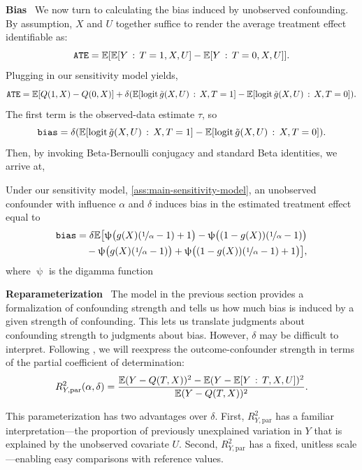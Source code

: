 \documentclass{article}
\DeclareRobustCommand{\parhead}[1]{\textbf{#1}~}
\newcommand{\digammafn}{\uppsi}
\begin{document}
%
%
%
%
%
%
%
%
%

%
%
%
%
%
%
%
%
%
%
%
%

\parhead{Bias}
We now turn to calculating the bias induced by unobserved confounding.
By assumption, $X$ and $U$ together
suffice to render the average treatment effect identifiable as:
\[
\mathtt{ATE}=\EE[\EE[Y\given T=1,X,U]-\EE[Y\given T=0,X,U]].
\] 
Plugging in our sensitivity model yields,
\[
  \mathtt{ATE} =\EE[Q(1,X)-Q(0,X)] +\delta(\EE[\logit\tilde{g}(X,U)\given X,T=1]-\EE[\logit\tilde{g}(X,U)\given X,T=0]).
\]
The first term is the observed-data estimate $\tau$, so
\[
  \mathtt{bias} = \delta(\EE[\logit\tilde{g}(X,U)\given X,T=1]-\EE[\logit\tilde{g}(X,U)\given X,T=0]).
\]
Then, by invoking Beta-Bernoulli conjugacy and standard Beta identities,
we arrive at,
\begin{theorem}\label{thm:bias-expression}
  Under our sensitivity model, \cref{ass:main-sensitivity-model}, an unobserved confounder with influence $\alpha$ and $\delta$ induces bias in
  the estimated treatment effect equal to
\begin{align*}
\mathtt{bias} & =\delta\EE\big[\digammafn \big(g(X)(\nicefrac{1}{\alpha}-1)+1 \big)-\digammafn \big((1-g(X))(\nicefrac{1}{\alpha}-1) \big)\\
 & \quad-\digammafn \big(g(X)(\nicefrac{1}{\alpha}-1)\big)+\digammafn \big((1-g(X))(\nicefrac{1}{\alpha}-1)+1 \big)\big],
\end{align*}
where $\digammafn$ is the digamma function
\end{theorem}

%
%

\parhead{Reparameterization}
The model in the previous section provides a formalization of confounding
strength and tells us how much bias is induced by a given strength
of confounding. This lets us translate judgments about confounding
strength to judgments about bias.
However, $\delta$ may be difficult to interpret.
%
%
%
%
Following \citet{Imbens:2003}, we will reexpress
the outcome-confounder strength in terms of the partial coefficient
of determination: 
\begin{equation*}
  R_{Y,\mathrm{par}}^{2}(\alpha,\delta)=\frac{\EE(Y-Q(T,X))^{2}-\EE(Y-\EE[Y\given T,X,U])^{2}}{\EE(Y-Q(T,X))^{2}}.
\end{equation*}

This parameterization has two advantages over $\delta$.
First, $R_{Y,\mathrm{par}}^{2}$ has a familiar interpretation---the proportion of previously
unexplained variation in $Y$ that is explained by the unobserved
covariate $U$.
Second,  $R_{Y,\mathrm{par}}^{2}$ has a fixed, unitless scale---enabling 
easy comparisons with reference values.
\end{document}
